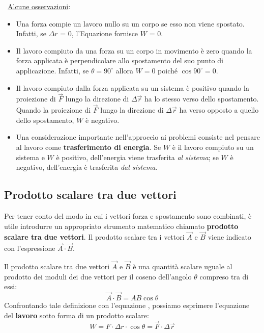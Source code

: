 \documentclass[a4paper,11pt,oneside]{book}
\begin{document}
~\newline \underline{Alcune osservazioni}:
\begin{itemize}
    \item Una forza compie un lavoro nullo su un corpo se esso non viene spostato. Infatti, se $\Delta r$ = 0, l’Equazione fornisce $W$ = 0.
    \item Il lavoro compiuto da una forza su un corpo in movimento è zero quando la forza applicata è perpendicolare allo spostamento del suo punto di applicazione. Infatti, se $\theta = 90^\circ$ allora $W = 0$ poiché $\cos{90^\circ} = 0$.
    \item Il lavoro compiuto dalla forza applicata su un sistema è positivo quando la proiezione di $\vec{F}$ lungo la direzione di $\Delta \vec{r}$ ha lo stesso verso dello spostamento.
    Quando la proiezione di $\vec{F}$ lungo la direzione di $\Delta \vec{r}$ ha verso opposto a quello dello spostamento, $W$ è negativo.
    \item Una considerazione importante nell’approccio ai problemi consiste nel pensare al lavoro come \textbf{trasferimento di energia}. Se $W$ è il lavoro compiuto su un sistema 
    e $W$ è positivo, dell’energia viene trasferita \emph{al sistema}; se $W$ è negativo, dell’energia è trasferita \emph{dal sistema}.
\end{itemize}

\subsection{Prodotto scalare tra due vettori}
Per tener conto del modo in cui i vettori forza e spostamento sono combinati, è utile introdurre un appropriato strumento matematico chiamato \textbf{prodotto scalare tra due vettori}. 
Il prodotto scalare tra i vettori $\vec{A}$ e $\vec{B}$ viene indicato con l’espressione $\vec{A}\cdot\vec{B}$.

Il prodotto scalare tra due vettori $\vec{A}$ e $\vec{B}$ è una quantità scalare uguale al prodotto dei moduli dei due vettori per il coseno dell’angolo $\theta$ compreso tra di essi:
\begin{equation*}
    \vec{A} \cdot \vec{B} = AB\cos{\theta}
\end{equation*}
Confrontando tale definizione con l'equazione , possiamo esprimere l’equazione del \textbf{lavoro} sotto forma di un prodotto scalare:
\begin{equation*}
    W = F \cdot \Delta r \cdot \cos{\theta} = \vec{F} \cdot \Delta \vec{r}
\end{equation*}
\end{document}
